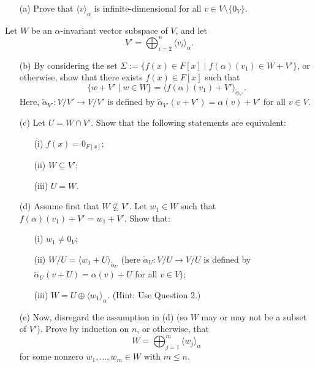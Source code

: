 \documentclass[12pt]{article}
\begin{document}
\begin{enumerate}
    \item[(a)] Prove that \(\langle v \rangle_\alpha\) is infinite-dimensional for all \(v \in V \setminus \{0_V\}.\)
\end{enumerate}

\noindent Let \(W\) be an \(\alpha\)-invariant vector subspace of \(V\), and let 
\[V' = \bigoplus_{i=2}^n \langle v_i \rangle_\alpha.\]
\begin{enumerate}
    \item[(b)]  By considering the set $\Sigma := \{f(x) \in F[x] \mid f(\alpha)(v_1) \in W + V'\}$, or otherwise, show that there exists \(f(x) \in F[x]\) such that 
    \[
    \{w + V' \mid w \in W\} = \langle f(\alpha)(v_1) + V' \rangle_{\widetilde{\alpha}_{V'}}.
    \]
    Here, \(\widetilde{\alpha}_{V'} : V/V' \to V/V'\) is defined by \(\widetilde{\alpha}_{V'}(v + V') = \alpha(v) + V'\) for all \(v \in V\). 

    \item[(c)] Let \(U = W \cap V'\). Show that the following statements are equivalent:
    \begin{enumerate}
        \item[(i)] \(f(x) = 0_{F[x]};\)
        \item[(ii)] \(W \subseteq V';\) 
        \item[(iii)] \(U = W.\) 
    \end{enumerate}

    \item[(d)] Assume first that \(W \nsubseteq V'\). Let \(w_1 \in W\) such that \(f(\alpha)(v_1) + V' = w_1 + V'\). Show that:
    \begin{enumerate}
        \item[(i)] \(w_1 \neq 0_V;\)
        \item[(ii)] \(W / U = \langle w_1 + U \rangle_{\widetilde{\alpha}_U}\) (here \(\widetilde{\alpha}_U : V/U \to V/U\) is defined by \(\widetilde{\alpha}_U(v + U) = \alpha(v) + U\) for all \(v \in V\));
        \item[(iii)] \(W = U \oplus \langle w_1 \rangle_\alpha.\) (Hint: Use Question 2.)
    \end{enumerate}

    \item[(e)] Now, disregard the assumption in (d) (so \(W\) may or may not be a subset of \(V'\)). Prove by induction on \(n\), or otherwise, that 
    \[
    W = \bigoplus_{j=1}^m \langle w_j \rangle_\alpha
    \]
    for some nonzero \(w_1, \ldots, w_m \in W\) with \(m \leq n.\)
\end{enumerate}
\end{document}
